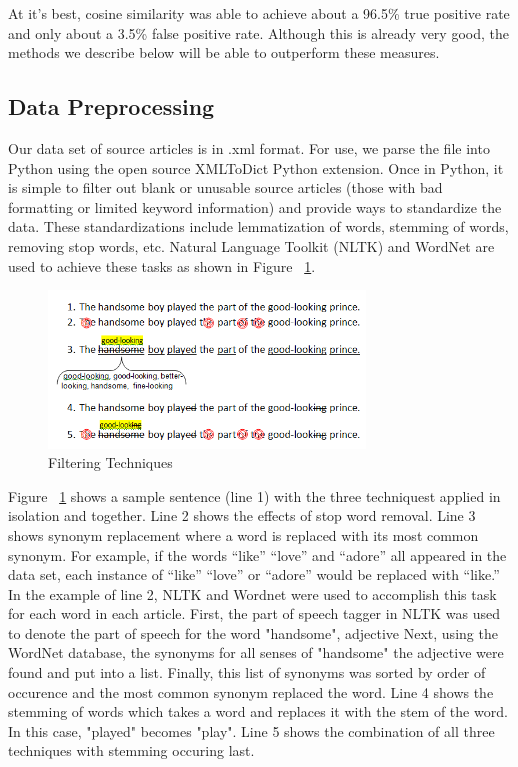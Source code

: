 \documentclass[11pt,letterpaper,oneside, titlepage]{scrartcl}
\begin{document}
\clearpage

At it’s best, cosine similarity was able to achieve about a 96.5\% true positive rate and only about a 3.5\% false positive rate. Although this is already very good, the methods we describe below will be able to outperform these measures.




\subsection{Data Preprocessing}

Our data set of source articles is in .xml format. For use, we parse the file into Python using the open source XMLToDict Python extension. Once in Python, it is simple to filter out blank or unusable source articles (those with bad formatting or limited keyword information) and provide ways to standardize the data. These standardizations include lemmatization of words, stemming of words, removing stop words, etc. Natural Language Toolkit (NLTK) and WordNet are used to achieve these tasks as shown in Figure ~\ref{fig:filtering}.

\begin{figure}[h!]
  \centering
  \includegraphics[width=0.75\textwidth]{filtering}
  \caption{Filtering Techniques}
  \label{fig:filtering}
\end{figure}

Figure ~\ref{fig:filtering} shows a sample sentence (line 1) with the three techniquest applied in isolation and together. Line 2 shows the effects of stop word removal. Line 3 shows synonym replacement where a word is replaced with its most common synonym. For example, if the words “like” “love” and “adore” all appeared in the data set, each instance of “like” “love” or “adore” would be replaced with “like.” In the example of line 2, NLTK and Wordnet were used to accomplish this task for each word in each article. First, the part of speech tagger in NLTK was used to denote the part of speech for the word "handsome", adjective Next, using the WordNet database, the synonyms for all senses of "handsome" the adjective were found and put into a list. Finally, this list of synonyms was sorted by order of occurence and the most common synonym replaced the word. Line 4 shows the stemming of words which takes a word and replaces it with the stem of the word. In this case, "played" becomes "play". Line 5 shows the combination of all three techniques with stemming occuring last.
\end{document}
